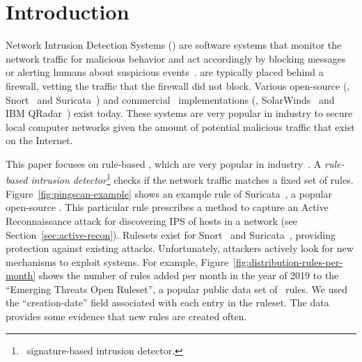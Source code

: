 \documentclass[sigconf,review, anonymous]{acmart}
\begin{document}


\maketitle

\section{Introduction}
\label{sec:intro}

Network Intrusion Detection Systems (\nids{}) are software systems
that monitor the network traffic for malicious behavior and act
accordingly by blocking messages or alerting humans about suspicious
events~\cite{Mitchell:2014:SID:2597757.2542049}. \nids{} are typically
placed behind a firewall, vetting the traffic that the firewall did
not block. Various open-source (\eg{}, Snort~\cite{snort} and
Suricata~\cite{suricata}) and commercial \nids\ implementations (\eg{},
SolarWinds~\cite{solarwinds} and IBM QRadar~\cite{qradar}) exist
today. These systems are very popular in industry to secure local
computer networks given the amount of potential malicious traffic that
exist on the Internet.

This paper focuses on rule-based \nids{}, which are very popular in
industry~\cite{proofpoint-etpro,snort-rule-subscriptions}. A
\emph{rule-based intrusion detector}\footnote{\aka\ signature-based
  intrusion detector.} checks if the network traffic matches a fixed
set of rules. Figure~\ref{fig:pingscan-example} shows an example rule
of Suricata~\cite{suricata}, a popular open-source \nids{}. This
particular rule prescribes a method to capture an Active
Reconnaissance attack for discovering IPS of hosts in a network (see
Section~\ref{sec:active-recon}). Rulesets exist for Snort~\cite{snort}
and Suricata~\cite{suricata}, providing protection against existing
attacks. Unfortunately, attackers actively look for new mechanisms to
exploit systems. For example,
Figure~\ref{fig:distribution-rules-per-month} shows the number of
rules added per month in the year of 2019 to the ``Emerging Threats
Open Ruleset'', a popular public data set of \suri\ rules. We used the
``creation-date'' field associated with each entry in the ruleset. The
data provides some evidence that new rules are created often.
\end{document}
